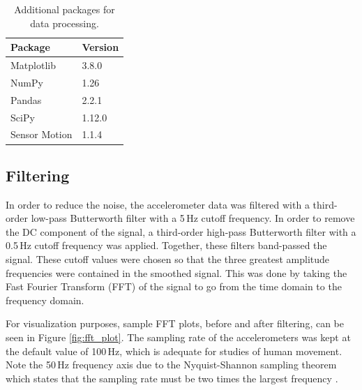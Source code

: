 \begin{table}[H] %
	\caption{Additional packages for data processing.}
	\centering %
	\begin{tabularx}{\linewidth}{X|X|} %
		\toprule
		Package & Version \\
		\midrule
		Matplotlib & 3.8.0 \\
		NumPy & 1.26\\
		Pandas & 2.2.1\\
		SciPy & 1.12.0\\
		Sensor Motion & 1.1.4\\
		\bottomrule
	\end{tabularx}
	\label{tab:packages}
\end{table} 

\subsection{Filtering}
In order to reduce the noise, the accelerometer data was filtered with a third-order low-pass Butterworth filter with a 5\,Hz cutoff frequency. In order to remove the DC component of the signal, a third-order high-pass Butterworth filter with a 0.5\,Hz cutoff frequency was applied. Together, these filters band-passed the signal. These cutoff values were chosen so that the three greatest amplitude frequencies were contained in the smoothed signal. This was done by taking the Fast Fourier Transform (FFT) of the signal to go from the time domain to the frequency domain. 

For visualization purposes, sample FFT plots, before and after filtering, can be seen in Figure \ref{fig:fft_plot}. The sampling rate of the accelerometers was kept at the default value of 100\,Hz, which is adequate for studies of human movement. Note the 50\,Hz frequency axis due to the Nyquist-Shannon sampling theorem which states that the sampling rate must be two times the largest frequency \cite{mcclellan_dsp_2017}.

